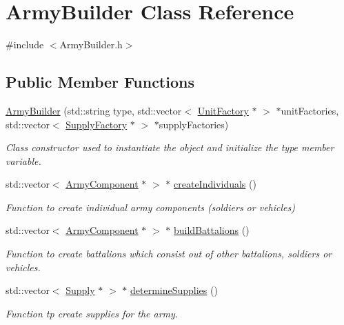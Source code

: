 \hypertarget{class_army_builder}{}\section{Army\+Builder Class Reference}
\label{class_army_builder}


{\ttfamily \#include $<$Army\+Builder.\+h$>$}

\subsection*{Public Member Functions}
\begin{DoxyCompactItemize}
\item 
\mbox{\hyperlink{class_army_builder_aa9f5c5cd78a653da928f234e0b93f677}{Army\+Builder}} (std\+::string type, std\+::vector$<$ \mbox{\hyperlink{class_unit_factory}{Unit\+Factory}} $\ast$ $>$ $\ast$unit\+Factories, std\+::vector$<$ \mbox{\hyperlink{class_supply_factory}{Supply\+Factory}} $\ast$ $>$ $\ast$supply\+Factories)
\begin{DoxyCompactList}\small\item\em Class constructor used to instantiate the object and initialize the type member variable. \end{DoxyCompactList}\item 
std\+::vector$<$ \mbox{\hyperlink{class_army_component}{Army\+Component}} $\ast$ $>$ $\ast$ \mbox{\hyperlink{class_army_builder_aefae08ee6f43f41d94d06891ad6fdbbb}{create\+Individuals}} ()
\begin{DoxyCompactList}\small\item\em Function to create individual army components (soldiers or vehicles) \end{DoxyCompactList}\item 
std\+::vector$<$ \mbox{\hyperlink{class_army_component}{Army\+Component}} $\ast$ $>$ $\ast$ \mbox{\hyperlink{class_army_builder_a4ff1c6808926f65820eceaf9adab2c16}{build\+Battalions}} ()
\begin{DoxyCompactList}\small\item\em Function to create battalions which consist out of other battalions, soldiers or vehicles. \end{DoxyCompactList}\item 
std\+::vector$<$ \mbox{\hyperlink{class_supply}{Supply}} $\ast$ $>$ $\ast$ \mbox{\hyperlink{class_army_builder_ae999bf5bc4c83243f2d000e6f981c986}{determine\+Supplies}} ()
\begin{DoxyCompactList}\small\item\em Function tp create supplies for the army. \end{DoxyCompactList}\item 

\end{DoxyCompactItemize}
